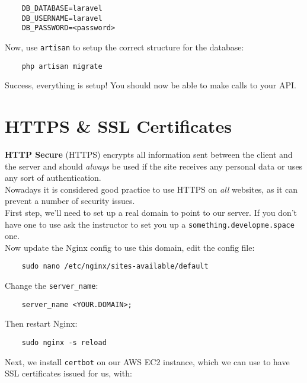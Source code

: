 \begin{verbatim}
    DB_DATABASE=laravel
    DB_USERNAME=laravel
    DB_PASSWORD=<password>
\end{verbatim}

Now, use \texttt{artisan} to setup the correct structure for the database:

\begin{verbatim}
    php artisan migrate
\end{verbatim}

Success, everything is setup! You should now be able to make calls to your API.


\section{HTTPS \& SSL Certificates}

\textbf{HTTP Secure} (HTTPS) encrypts all information sent between the client and the server and should \textit{always} be used if the site receives any personal data or uses any sort of authentication.
\\

Nowadays it is considered good practice to use HTTPS on \textit{all} websites, as it can prevent a number of security issues.
\\

First step, we'll need to set up a real domain to point to our server. If you don't have one to use ask the instructor to set you up a \texttt{something.developme.space} one.
\\

Now update the Nginx config to use this domain, edit the config file:

\begin{verbatim}
    sudo nano /etc/nginx/sites-available/default
\end{verbatim}

Change the \texttt{server\_name}:

\begin{verbatim}
    server_name <YOUR.DOMAIN>;
\end{verbatim}

Then restart Nginx:

\begin{verbatim}
    sudo nginx -s reload
\end{verbatim}

Next, we install \texttt{certbot} on our AWS EC2 instance, which we can use to have SSL certificates issued for us, with:


